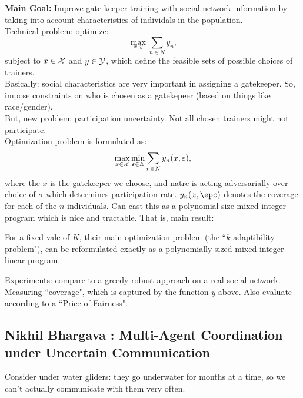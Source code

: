 {\bf Main Goal:} Improve gate keeper training with social network information by taking into account characteristics of individals in the population. \\

Technical problem: optimize:
\begin{equation}
    \max_{x,y} \sum_{n \in N} y_n,
\end{equation}
subject to $x \in \mathcal{X}$ and $y \in \mathcal{Y}$, which define the feasible sets of possible choices of trainers. \\

Basically: social characteristics are very important in assigning a gatekeeper. So, impose constraints on who is chosen as a gatekepeer (based on things like race/gender). \\

But, new problem: participation uncertainty. Not all chosen trainers might not participate. \\

Optimization problem is formulated as:
\begin{equation}
    \max_{x \in \mathcal{X}} \min_{\varepsilon \in E} \sum_{n \in N} y_n(x,\varepsilon),
\end{equation}
where the $x$ is the gatekeeper we choose, and natre is acting adversarially over choice of $\sigma$ which determines participation rate. $y_n(x,\epc)$ denotes the coverage for each of the $n$ individuals. Can cast this as a polynomial size mixed integer program which is nice and tractable. That is, main result:
\begin{theorem}
For a fixed vale of $K$, their main optimization problem (the ``$k$ adaptibility problem"), can be reformulated exactly as a polynomially sized mixed integer linear program.
\end{theorem}

Experiments: compare to a greedy robust approach on a real social network. Measuring ``coverage", which is captured by the function $y$ above. Also evaluate according to a ``Price of Fairness".


\subsection{Nikhil Bhargava	: Multi-Agent Coordination under Uncertain Communication}

Consider under water gliders: they go underwater for months at a time, so we can't actually communicate with them very often.\\

